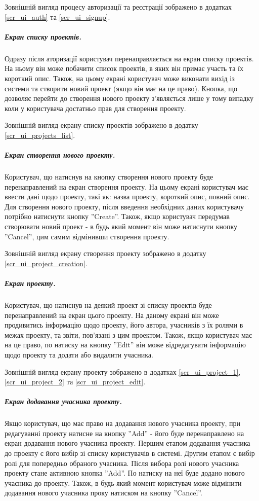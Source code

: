 \documentclass[../main.tex]{subfiles}
\begin{document}
Зовнішній вигляд процесу авторизації та реєстрації зображено в додатках \ref{scr_ui_auth} та \ref{scr_ui_signup}.

\subparagraph{Екран списку проектів.}

Одразу після аторизації користувач перенаправляється на екран списку проектів. На ньому він може побачити список проектів, в яких він примає участь та їх короткий опис. Також, на цьому екрані користувач може виконати вихід із системи та створити новий проект (якщо він має на це право). Кнопка, що дозволяє перейти до створення нового проекту з'являється лише у тому випадку коли у користувача достатньо прав для створення проекту.

Зовнішній вигляд екрану списку проектів зображено в додатку \ref{scr_ui_projects_list}.

\subparagraph{Екран створення нового проекту.}

Користувач, що натиснув на кнопку створення нового проекту буде перенаправлений на екран створення проекту. На цьому екрані користувач має ввести дані щодо проекту, такі як: назва проекту, короткий опис, повний опис. Для створення нового проекту, після введення необхідних даних користувачу потрібно натиснути кнопку ''Create''. Також, якщо користувач передумав створювати новий проект - в будь який момент він може натиснути кнопку ''Cancel'', цим самим відмінивши створення проекту.

Зовнішній вигляд екрану створення проекту зображено в додатку \ref{scr_ui_project_creation}.

\subparagraph{Екран проекту.}

Користувач, що натиснув на деякий проект зі списку проектів буде перенаправлений на екран цього проекту. На даному екрані він може продивитись інформацію щодо проекту, його автора, учасників з їх ролями в межах проекту, та звіти, пов'язані з цим проектом. Також, якщо користувач має на це право, по натиску на кнопку ''Edit'' він може відредагувати інформацію щодо проекту та додати або видалити учасника.

Зовнішній вигляд екрану проекту зображено в додатках \ref{scr_ui_project_1}, \ref{scr_ui_project_2} та \ref{scr_ui_project_edit}.

\subparagraph{Екран додавання учасника проекту.}

Якщо користувач, що має право на додавання нового учасника проекту, при редагуванні проекту натисне на кнопку ''Add'' - його буде перенаправлено на екран додавання нового учасника проекту. Першим етапом додавання учасника до проекту є його вибір зі списку користувачів в системі. Другим етапом є вибір ролі для попередньо обраного учасника. Після вибора ролі нового учасника проекту стане активною кнопка ''Add''. По натиску на неї буде додано нового учасника до проекту. Також, в будь-який момент користувач може відмінити додавання нового учасника проку натиском на кнопку ''Cancel''.
\end{document}
